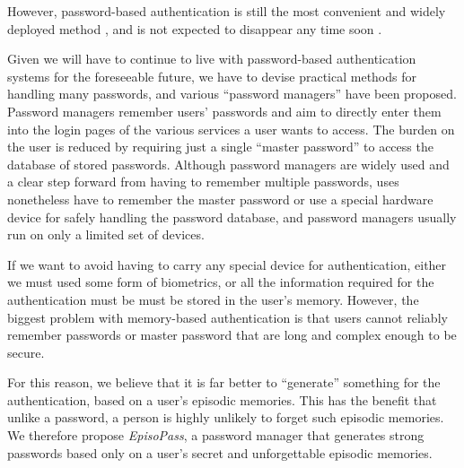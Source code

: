 \documentclass[runningheads,a4paper]{llncs}
\begin{document}

However, password-based authentication is still the most
convenient and widely deployed method \cite{Bonneau:ReplacePasswords},
and is not expected to disappear any time soon \cite{Herley:2009:PSS:1601990.1602010}.

Given we will have to continue to live with password-based
authentication systems for the foreseeable future, we have to devise
practical methods for handling many passwords, and various ``password
managers''
have been proposed\cite{OnePassword,Dashlane,MilPass,LastPass,KeyPass,NortonIDSafe,IDManager}.
%
Password managers remember users' passwords and aim to directly enter
them into the login pages of the various services a user wants to
access.
%
The burden on the user is reduced by requiring just a single ``master
password'' to access the database of stored passwords.
%
Although password managers are widely used and a clear step forward
from having to remember multiple passwords, uses nonetheless have to
remember the master password or use a special hardware device for
safely handling the password database, and password managers usually
run on only a limited set of devices.

%

If we want to avoid having to carry any special device for
authentication, either we must used some form of biometrics, or all
the information required for the authentication must be must be stored
in the user's memory.
%
However, the biggest problem with memory-based authentication is that
users cannot reliably remember passwords or master password that are
long and complex enough to be secure.

For this reason, we believe that it is far better to ``generate''
something for the authentication, based on a user's episodic
memories. This has the benefit that unlike a password, a person is
highly unlikely to forget such episodic memories.
%
%
We therefore propose \textit{EpisoPass}, a password manager that
generates strong passwords based only on a user's secret and
unforgettable episodic memories.
\end{document}
